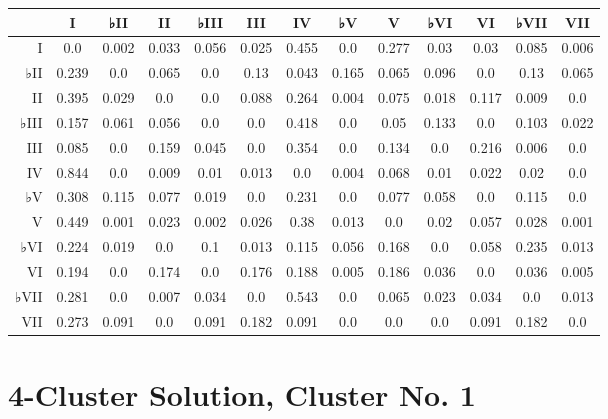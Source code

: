 \begin{table}[htbp]
\begin{minipage}{\linewidth}
\setlength{\tymax}{0.5\linewidth}
\centering
\small
\begin{tabulary}{\textwidth}{@{}RCCCCCCCCCCCC@{}} \toprule
&I&♭II&II&♭III&III&IV&♭V&V&♭VI&VI&♭VII&VII\\
\midrule
I&0.0&0.002&0.033&0.056&0.025&0.455&0.0&0.277&0.03&0.03&0.085&0.006\\
♭II&0.239&0.0&0.065&0.0&0.13&0.043&0.165&0.065&0.096&0.0&0.13&0.065\\
II&0.395&0.029&0.0&0.0&0.088&0.264&0.004&0.075&0.018&0.117&0.009&0.0\\
♭III&0.157&0.061&0.056&0.0&0.0&0.418&0.0&0.05&0.133&0.0&0.103&0.022\\
III&0.085&0.0&0.159&0.045&0.0&0.354&0.0&0.134&0.0&0.216&0.006&0.0\\
IV&0.844&0.0&0.009&0.01&0.013&0.0&0.004&0.068&0.01&0.022&0.02&0.0\\
♭V&0.308&0.115&0.077&0.019&0.0&0.231&0.0&0.077&0.058&0.0&0.115&0.0\\
V&0.449&0.001&0.023&0.002&0.026&0.38&0.013&0.0&0.02&0.057&0.028&0.001\\
♭VI&0.224&0.019&0.0&0.1&0.013&0.115&0.056&0.168&0.0&0.058&0.235&0.013\\
VI&0.194&0.0&0.174&0.0&0.176&0.188&0.005&0.186&0.036&0.0&0.036&0.005\\
♭VII&0.281&0.0&0.007&0.034&0.0&0.543&0.0&0.065&0.023&0.034&0.0&0.013\\
VII&0.273&0.091&0.0&0.091&0.182&0.091&0.0&0.0&0.0&0.091&0.182&0.0\\

\bottomrule

\end{tabulary}
\end{minipage}
\end{table}

\section{4-Cluster Solution, Cluster No. 1}
\label{4-clustersolutionclusterno.1}


